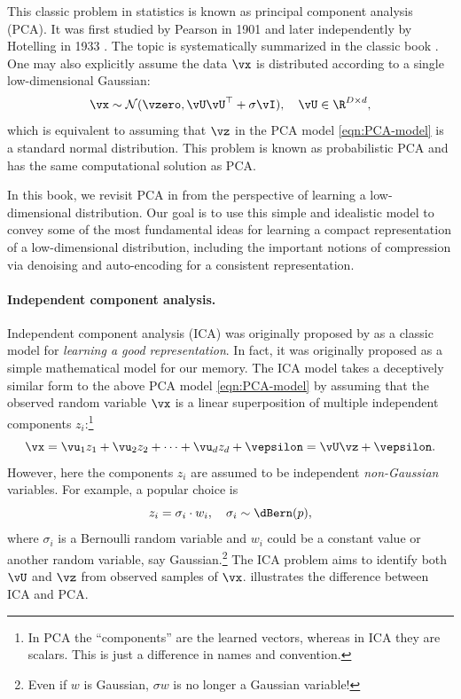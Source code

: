 \documentclass[../../book-main.tex]{subfiles}
\begin{document}
This classic problem in statistics is known as principal component
analysis (PCA). It was first studied by Pearson in 1901
\cite{Pearson1901} and later independently by Hotelling in 1933
\cite{Hotelling1933}. The topic is systematically summarized in the
classic book \cite{Jolliffe1986,JolliffeI2002}.
One may also explicitly assume the data \(\vx\) is distributed
according to a single low-dimensional Gaussian:
\begin{equation}
    \vx \sim \mathcal{N}(\vzero, \vU\vU^{\top} + \sigma \vI), \quad
    \vU \in \R^{D\times d},
\end{equation}
which is equivalent to assuming that \(\vz\) in the PCA model
\eqref{eqn:PCA-model} is a standard normal distribution. This problem
is known as probabilistic PCA \cite{TippingM1999} and has the same
computational solution as PCA.

In this book, we revisit PCA in  from the
perspective of learning a low-dimensional distribution. Our goal is
to use this simple and idealistic model to convey some of the most
fundamental ideas for learning a compact representation of a
low-dimensional distribution, including the important notions of
compression via denoising and auto-encoding for a consistent representation.
\paragraph{Independent component analysis.}
Independent component analysis (ICA) was originally proposed by
\cite{Ans-1985} as a classic model for \textit{learning a good
representation}. In fact, it was originally proposed as a simple
mathematical model for our memory. The ICA model takes a deceptively
similar form to the above PCA model \eqref{eqn:PCA-model} by assuming
that the observed random variable \(\vx\) is a linear superposition
of multiple independent components \(z_{i}\):\footnote{In PCA the
    ``components'' are the learned vectors, whereas in ICA they are
scalars. This is just a difference in names and convention.}
\begin{equation}
    \vx = \vu_{1} z_{1} + \vu_{2} z_{2} + \cdots + \vu_{d} z_{d}  +
    \vepsilon =  \vU \vz + \vepsilon.
    \label{eqn:ICA-model}
\end{equation}
However, here the components \(z_{i}\) are assumed to be independent
\textit{non-Gaussian} variables. For example, a popular choice is
\begin{equation}
    z_{i} = \sigma_{i} \cdot w_{i}, \quad \sigma_{i} \sim \dBern(p),
    \label{eqn:ICA-modes}
\end{equation}
where \(\sigma_{i}\) is a Bernoulli random variable and \(w_{i}\)
could be a constant value or another random variable, say
Gaussian.\footnote{Even if \(w\) is Gaussian, \(\sigma w\) is no
longer a Gaussian variable!} The ICA problem aims to identify both
\(\vU\) and \(\vz\) from observed samples of \(\vx\).
 illustrates the difference between ICA and PCA.
\end{document}
